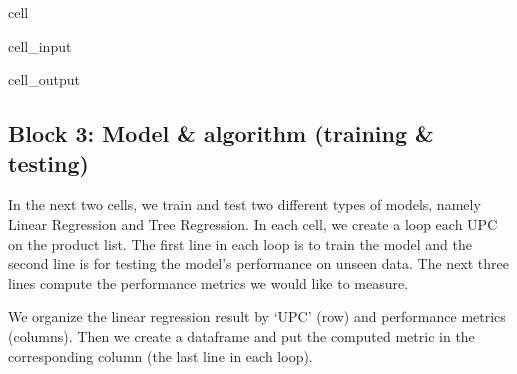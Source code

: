 \documentclass[letterpaper,10pt,english]{jupyterBook}
\begin{document}
\begin{sphinxuseclass}{cell}
\begin{sphinxVerbatimInput}
\begin{sphinxuseclass}{cell_input}
\end{sphinxuseclass}\end{sphinxVerbatimInput}
\begin{sphinxVerbatimOutput}

\begin{sphinxuseclass}{cell_output}
\begin{sphinxVerbatim}[commandchars=\\\{\}]
[1111085319 1111085350 1600027527 1600027528 1600027564 3000006340
 3800031829]
\end{sphinxVerbatim}

\end{sphinxuseclass}\end{sphinxVerbatimOutput}

\end{sphinxuseclass}

\subsection{Block 3: Model \& algorithm (training \& testing)}
\label{\detokenize{docs/Case1_2_Module1A_Retail_Demand_Model:block-3-model-algorithm-training-testing}}
\sphinxAtStartPar
In the next two cells, we train and test two different types of models, namely Linear Regression and Tree Regression. In each cell, we create a loop  each UPC on the product list. The first line in each loop is to train the model and the second line is for testing the model’s performance on unseen data. The next three lines compute the performance metrics we would like to measure.

\sphinxAtStartPar
We organize the linear regression result by ‘UPC’ (row) and performance metrics (columns). Then we create a dataframe and put the computed metric in the corresponding column (the last line in each loop).
\end{document}
